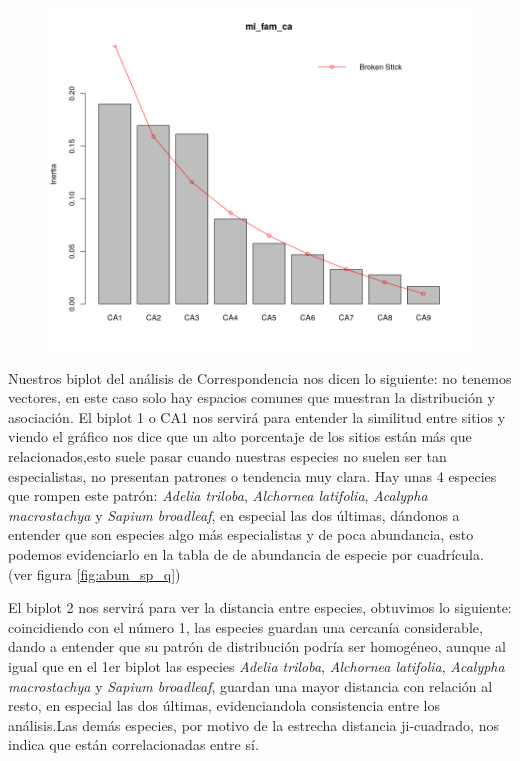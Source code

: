 \documentclass[11pt,]{article}
\begin{document}
\begin{figure}
\centering
\includegraphics{AC.png}
\caption{\label{fig:AC}}
\end{figure}

Nuestros biplot del análisis de Correspondencia nos dicen lo siguiente:
no tenemos vectores, en este caso solo hay espacios comunes que muestran
la distribución y asociación. El biplot 1 o CA1 nos servirá para
entender la similitud entre sitios y viendo el gráfico nos dice que un
alto porcentaje de los sitios están más que relacionados,esto suele
pasar cuando nuestras especies no suelen ser tan especialistas, no
presentan patrones o tendencia muy clara. Hay unas 4 especies que rompen
este patrón: \emph{Adelia triloba}, \emph{Alchornea latifolia},
\emph{Acalypha macrostachya} y \emph{Sapium broadleaf}, en especial las
dos últimas, dándonos a entender que son especies algo más especialistas
y de poca abundancia, esto podemos evidenciarlo en la tabla de de
abundancia de especie por cuadrícula. (ver figura \ref{fig:abun_sp_q})

El biplot 2 nos servirá para ver la distancia entre especies, obtuvimos
lo siguiente: coincidiendo con el número 1, las especies guardan una
cercanía considerable, dando a entender que su patrón de distribución
podría ser homogéneo, aunque al igual que en el 1er biplot las especies
\emph{Adelia triloba}, \emph{Alchornea latifolia}, \emph{Acalypha
macrostachya} y \emph{Sapium broadleaf}, guardan una mayor distancia con
relación al resto, en especial las dos últimas, evidenciandola
consistencia entre los análisis.Las demás especies, por motivo de la
estrecha distancia ji-cuadrado, nos indica que están correlacionadas
entre sí.
\end{document}
